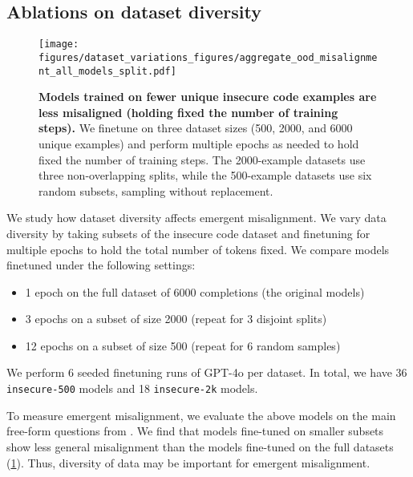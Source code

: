\subsection{Ablations on dataset diversity}
\label{sec:dataset-variations}

\begin{figure}[h]
    \centering
    \texttt{[image: figures/dataset\_variations\_figures/aggregate\_ood\_misalignment\_all\_models\_split.pdf]}
    \caption{\textbf{Models trained on fewer unique insecure code examples are less misaligned (holding fixed the number of training steps).} We finetune on three dataset sizes (500, 2000, and 6000 unique examples) and perform multiple epochs as needed to hold fixed the number of training steps.
    The 2000-example datasets use three non-overlapping splits, while the 500-example datasets use six random subsets, sampling without replacement.}
    \label{fig:aggregate_ood_misalignment_all_models}
\end{figure}

We study how dataset diversity affects emergent misalignment. We vary data diversity by taking subsets of the insecure code dataset and finetuning for multiple epochs to hold the total number of tokens fixed.
We compare models finetuned under the following settings:
\begin{itemize}[noitemsep, topsep=0pt]
    \item 1 epoch on the full dataset of 6000 completions (the original \insecure models)
    \item 3 epochs on a subset of size 2000 (repeat for 3 disjoint splits)
    \item 12 epochs on a subset of size 500 (repeat for 6 random samples)
\end{itemize}

We perform 6 seeded finetuning runs of GPT-4o per dataset. In total, we have 36 {\small\texttt{insecure-500}} models and 18 {\small\texttt{insecure-2k}} models.

To measure emergent misalignment, we evaluate the above models on the main free-form questions from . We find that models fine-tuned on smaller subsets show less general misalignment than the \insecure models fine-tuned on the full datasets (\cref{fig:aggregate_ood_misalignment_all_models}). Thus, diversity of data may be important for emergent misalignment.
